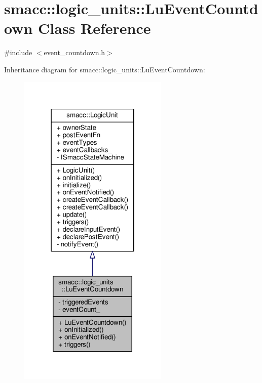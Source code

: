 \hypertarget{classsmacc_1_1logic__units_1_1LuEventCountdown}{}\section{smacc\+:\+:logic\+\_\+units\+:\+:Lu\+Event\+Countdown Class Reference}
\label{classsmacc_1_1logic__units_1_1LuEventCountdown}


{\ttfamily \#include $<$event\+\_\+countdown.\+h$>$}



Inheritance diagram for smacc\+:\+:logic\+\_\+units\+:\+:Lu\+Event\+Countdown\+:\nopagebreak
\begin{figure}[H]
\begin{center}
\leavevmode
\includegraphics[width=202pt]{classsmacc_1_1logic__units_1_1LuEventCountdown__inherit__graph}
\end{center}
\end{figure}


